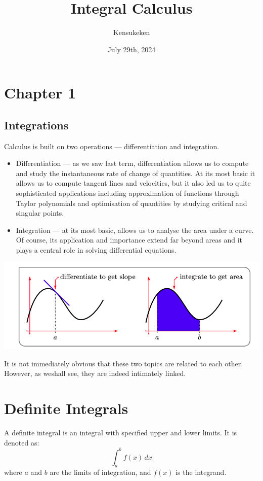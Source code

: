 \documentclass{article}
\title{Integral Calculus}
\author{Kensukeken}
\date{July 29th, 2024}
\begin{document}
\maketitle
\tableofcontents
\newpage 

\section{Chapter 1}
\subsection*{Integrations}
Calculus is built on two operations — differentiation and integration. 
\begin{itemize}
  \item Differentiation — as we saw last term, differentiation allows us to compute and study the instantaneous rate of change of quantities. At its most basic it allows us to compute tangent lines and velocities, but it also led us to quite sophisticated applications including approximation of functions through Taylor polynomials and optimisation of quantities by studying critical and singular points. 
  \item Integration — at its most basic, allows us to analyse the area under a curve. Of course, its application and importance extend far beyond areas and it plays a central role in solving differential equations.
\end{itemize}
\includegraphics{./imgs/integral.png}

It is not immediately obvious that these two topics are related to each other. However, as weshall see, they are indeed intimately linked.



\section{Definite Integrals}

A definite integral is an integral with specified upper and lower limits. It is denoted as:
\[
\int_{a}^{b} f(x) \, dx
\]
where \(a\) and \(b\) are the limits of integration, and \(f(x)\) is the integrand.
\end{document}
